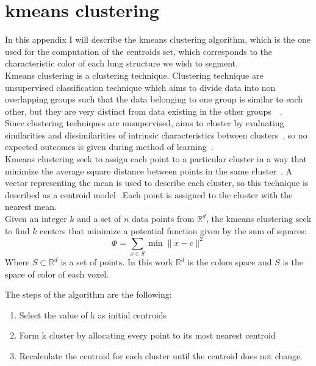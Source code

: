 \documentclass{standalone}
\begin{document}
	\chapter*{kmeans clustering}
	
	
	
	
	In this appendix I will describe the kmeans clustering algorithm, which is the one used for the computation of the centroids set, which corresponds to the characteristic color of each lung structure we wish to segment. \\
	Kmeans clustering is a clustering technique. Clustering technique are unsupervised classification technique which aims to divide data into non overlapping groups such that the data belonging to one group is similar to each other, but they are very distinct from data existing in the other groups~\cite{ART:Arshleen}~\cite{ART:Morisette}.\\ Since clustering techniques are unsupervised, aims to cluster by evaluating similarities and dissimilarities of intrinsic characteristics between clusters~\cite{ART:Morisette}, so no expected outcomes is given during method of learning~\cite{ART:Arshleen}.\\
	Kmeans clustering seek to assign each point to a particular cluster in a way that minimize the average square distance between points in the same cluster~\cite{Arthur2007}. A vector representing the mean is used to describe each cluster, so this technique is described as a centroid model~\cite{ART:Morisette}.Each point is assigned to the cluster with the nearest mean.\\
	
	Given an integer $k$ and a set of $n$ data points from $\mathbb{R}^d$, the kmeans clustering seek to find $k$ centers that minimize a potential function given by the sum of squares: 
	\begin{equation}
		\Phi = \sum_{x\in S}\min\| x - c\|^2
	\end{equation} 
	Where $S\subset \mathbb R^d$ is a set of points. In this work $\mathbb{R}^d$ is the colors space and $S$ is the space of color of each voxel.
	
	The steps of the algorithm are the following: 
	\begin{enumerate}
		\item Select the value of k as initial centroids
		\item Form k cluster by allocating every point to its most nearest centroid
		\item Recalculate the centroid for each cluster until the centroid does not change.

	\end{enumerate}
	
\end{document}
